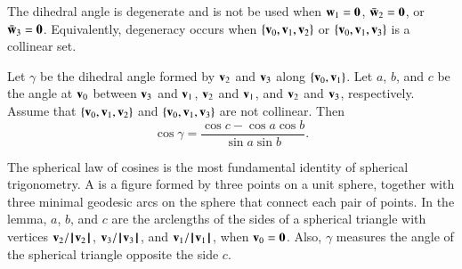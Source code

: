 The dihedral angle is degenerate and is not be used when ${\mathbf w}_1 =
{\mathbf 0}$, $\bar {{\mathbf w}}_2 = {\mathbf 0}$, or $\bar {{\mathbf w}}_3 = {\mathbf 0}$.  Equivalently, degeneracy
occurs when $\{{\mathbf v}_0,{\mathbf v}_1,{\mathbf v}_2\}$ or $\{{\mathbf v}_0,{\mathbf v}_1,{\mathbf v}_3\}$ is a collinear set.

\begin{lemma}\label{lemma:sloc}
    Let $\gamma$ be the
  dihedral angle formed by ${\mathbf v}_2$ and ${\mathbf v}_3$ along $\{{\mathbf v}_0,{\mathbf v}_1\}$.  Let
  $a$, $b$, and $c$ be the angle at ${\mathbf v}_0$ between ${\mathbf v}_3$ and ${\mathbf v}_1$, ${\mathbf v}_2$
  and ${\mathbf v}_1$, and ${\mathbf v}_2$ and ${\mathbf v}_3$, respectively. %
  Assume that $\{{\mathbf v}_0,{\mathbf v}_1,{\mathbf v}_2\}$ and $\{{\mathbf v}_0,{\mathbf v}_1,{\mathbf v}_3\}$ are not collinear.
  Then
  \begin{displaymath}\cos\gamma = \frac{\cos c - \cos a \cos b}{\sin
      a\sin b}.\end{displaymath}
\end{lemma}
%
%
%

\begin{remark}
  The spherical law of cosines is the most fundamental identity of
  spherical trigonometry.  A  is a figure
  formed by three points on a unit sphere, together with three minimal
  geodesic arcs on the sphere that connect each pair of points.  In
  the lemma, $a$, $b$, and $c$ are the arclengths of the sides of a
  spherical triangle with vertices ${\mathbf v}_2/{{\hskip0.1em|\hskip-0.15em|\hskip0.1em}{\mathbf v}_2{\hskip0.1em|\hskip-0.15em|\hskip0.1em}}$,
  ${\mathbf v}_3/{{\hskip0.1em|\hskip-0.15em|\hskip0.1em}{\mathbf v}_3{\hskip0.1em|\hskip-0.15em|\hskip0.1em}}$, and ${\mathbf v}_1/{{\hskip0.1em|\hskip-0.15em|\hskip0.1em}{\mathbf v}_1{\hskip0.1em|\hskip-0.15em|\hskip0.1em}}$, when ${\mathbf v}_0={\mathbf 0}$.
  Also, $\gamma$ measures the angle of the spherical triangle opposite
  the side $c$.  %
\end{remark}



